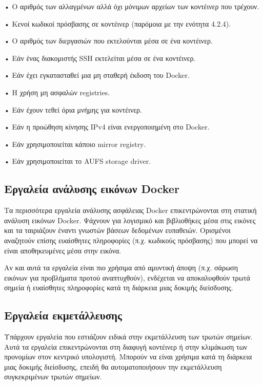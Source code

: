 • Ο αριθμός των αλλαγμένων αλλά όχι μόνιμων αρχείων των κοντέινερ που τρέχουν.

• Κενοί κωδικοί πρόσβασης σε κοντέινερ (παρόμοια με την ενότητα 4.2.4).

• Ο αριθμός των διεργασιών που εκτελούνται μέσα σε ένα κοντέινερ.

• Εάν ένας διακομιστής \textlatin{SSH} εκτελείται μέσα σε ένα κοντέινερ.

• Εάν έχει εγκατασταθεί μια μη σταθερή έκδοση του \textlatin{Docker}.

• Η χρήση μη ασφαλών \textlatin{registries}.

• Εάν έχουν τεθεί όρια μνήμης για κοντέινερ.

• Εάν η προώθηση κίνησης \textlatin{IPv4} είναι ενεργοποιημένη στο
\textlatin{Docker}.

• Εάν χρησιμοποιείται κάποιο \textlatin{mirror registry}.

• Εάν χρησιμοποιείται το \textlatin{AUFS storage driver}.

\subsection{Εργαλεία ανάλυσης εικόνων \textlatin{Docker}}

Τα περισσότερα εργαλεία ανάλυσης ασφάλειας \textlatin{Docker} επικεντρώνονται
στη στατική ανάλυση εικόνων \textlatin{Docker}. Ψάχνουν για λογισμικό και
βιβλιοθήκες μέσα στις εικόνες και τα ταιριάζουν έναντι γνωστών βάσεων δεδομένων
ευπαθειών. Ορισμένοι αναζητούν επίσης ευαίσθητες πληροφορίες (π.χ. κωδικούς
πρόσβασης) που μπορεί να είναι αποθηκευμένες μέσα στην εικόνα.

Αν και αυτά τα εργαλεία είναι πιο χρήσιμα από αμυντική άποψη (π.χ.
σάρωση εικόνων για προβλήματα προτού αναπτυχθούν), ενδέχεται να αποκαλυφθούν
τρωτά σημεία ή ευαίσθητες πληροφορίες κατά τη διάρκεια μιας δοκιμής διείσδυσης.


\subsection{Εργαλεία εκμετάλλευσης}

Υπάρχουν εργαλεία που εστιάζουν ειδικά στην εκμετάλλευση των τρωτών σημείων.
Αυτά τα εργαλεία επικεντρώνονται στη διαφυγή κοντέινερ ή στην κλιμάκωση των
προνομίων στον κεντρικό υπολογιστή. Μπορούν να είναι χρήσιμα κατά τη διάρκεια
μιας δοκιμής διείσδυσης, επειδή θα αυτοματοποιήσουν την εκμετάλλευση
συγκεκριμένων τρωτών σημείων.

